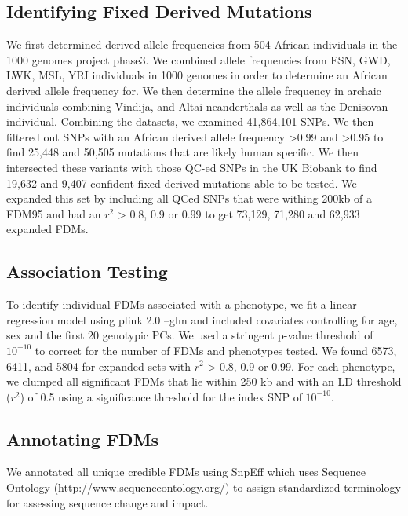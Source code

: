 \subsection{Identifying Fixed Derived Mutations}
 We first determined derived allele frequencies from 504 African individuals in the 1000 genomes project phase3. We combined allele frequencies from ESN, GWD, LWK, MSL, YRI individuals in 1000 genomes in order to determine an African derived allele frequency for. We then determine the allele frequency in archaic individuals combining Vindija, and Altai neanderthals as well as the Denisovan individual. Combining the datasets, we examined 41,864,101 SNPs. We then filtered out SNPs with an African derived allele frequency >0.99 and >0.95 to find 25,448 and 50,505 mutations that are likely human specific. We then intersected these variants with those QC-ed SNPs in the UK Biobank to find 19,632 and 9,407 confident fixed derived mutations able to be tested. We expanded this set by including all QCed SNPs that were withing 200kb of a FDM95 and had an $r^2$ > 0.8, 0.9 or 0.99 to get 73,129, 71,280 and 62,933 expanded FDMs. 
 
\subsection{Association Testing}
To identify individual FDMs associated with a phenotype, we fit a linear regression model using plink 2.0 --glm and included covariates controlling for age, sex and the first 20 genotypic PCs. We used a stringent p-value threshold of $10^{-10}$ to correct for the number of FDMs and phenotypes tested. We found 6573, 6411, and 5804 for expanded sets with $r^2$ > 0.8, 0.9 or 0.99. For each phenotype, we clumped all significant FDMs that lie within 250 kb and with an LD threshold ($r^2$) of 0.5 using a significance threshold for the index SNP of $10^{-10}$.
\subsection{Annotating FDMs}
We annotated all unique credible FDMs using SnpEff \cite{cingolani2012program} which uses Sequence Ontology (http://www.sequenceontology.org/) to assign standardized terminology for assessing sequence change and impact. 


